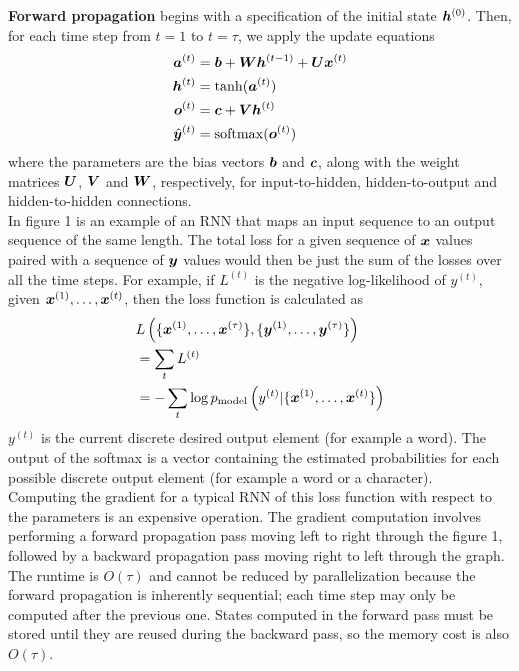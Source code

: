 \begin{multicols}{2}
\begin{figure}[H]
	\end{figure}

	\textbf{Forward propagation} begins with a specification of the initial state ${\bm{h}}^{(0)}$.
	Then, for each time step from $t=1$ to $t=\tau$, we apply the update equations
	\begin{align*}
	{\bm{a}}^{(t)} &= {\bm{b}}+{\bm{W}}{\bm{h}}^{(t-1)} +{\bm{U}}{\bm{x}}^{(t)}\\
	{\bm{h}}^{(t)} &= \tanh({\bm{a}}^{(t)})\\
	{\bm{o}}^{(t)} &= {\bm{c}}+{\bm{V}}{\bm{h}}^{(t)}\\
	\hat{{\bm{y}}}^{(t)} &= \mathrm{softmax}({\bm{o}}^{(t)})
	\end{align*}
	where the parameters are the bias vectors ${\bm{b}}$ and ${\bm{c}}$, along with the weight matrices ${\bm{U}}$, ${\bm{V}}$ and ${\bm{W}}$, respectively, for input-to-hidden, hidden-to-output and hidden-to-hidden connections.\\

	In figure 1 is an example of an RNN that maps an input sequence to an output sequence of the same length.
	The total loss for a given sequence of ${\bm{x}}$ values paired with a sequence of ${\bm{y}}$ values would then be just the sum of the losses over all the time steps.
	For example, if $L^{(t)}$ is the negative log-likelihood of $y^{(t)}$, given ${\bm{x}}^{(1)},\dots,{\bm{x}}^{(t)}$, then the loss function is calculated as
	\begin{align*}
	& L\left( \{ {\bm{x}}^{(1)},\dots,{\bm{x}}^{(\tau)} \}, \{ {\bm{y}}^{(1)},\dots,{\bm{y}}^{(\tau)} \} \right)\\
	&= \sum_t L^{(t)}\\
	&= -\sum_t \log p_{\text{model}}\left(y^{(t)}| \{ {\bm{x}}^{(1)},\dots,{\bm{x}}^{(t)} \} \right)
	\end{align*}
	$y^{(t)}$ is the current discrete desired output element (for example a word).
	The output of the softmax is a vector containing the estimated probabilities for each possible discrete output element (for example a word or a character).\\

	Computing the gradient for a typical RNN of this loss function with respect to the parameters is an expensive operation.
	The gradient computation involves performing a forward propagation pass moving left to right through the figure 1, followed by a backward propagation pass moving right to left through the graph.
	The runtime is $O(\tau)$ and cannot be reduced by parallelization because the forward propagation is inherently sequential; each time step may only be computed after the previous one.
	States computed in the forward pass must be stored until they are reused during the backward pass, so the memory cost is also $O(\tau)$.\\


\end{multicols}
